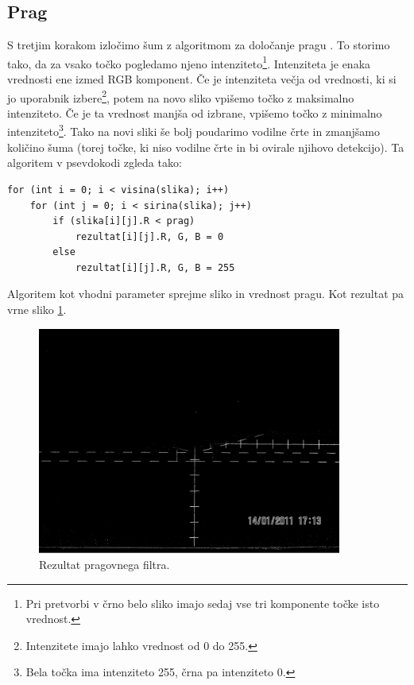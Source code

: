 \documentclass[oneside, a4paper, 12pt]{book}
\begin{document}
\subsection{Prag}
S tretjim korakom izločimo šum z algoritmom za določanje pragu \cite{treshold-wiki}. To storimo tako, da za vsako točko pogledamo njeno intenziteto\footnote{Pri pretvorbi v črno belo sliko imajo sedaj vse tri komponente točke isto vrednost.}. Intenziteta je enaka vrednosti ene izmed RGB komponent. Če je intenziteta večja od vrednosti, ki si jo uporabnik izbere\footnote{Intenzitete imajo lahko vrednost od 0 do 255.}, potem na novo sliko vpišemo točko z maksimalno intenziteto. Če je ta vrednost manjša od izbrane, vpišemo točko z minimalno intenziteto\footnote{Bela točka ima intenziteto 255, črna pa intenziteto 0.}. Tako na novi sliki še bolj poudarimo vodilne črte in zmanjšamo količino šuma (torej točke, ki niso vodilne črte in bi ovirale njihovo detekcijo). Ta algoritem v psevdokodi zgleda tako:
\begin{samepage}
\begin{verbatim}
for (int i = 0; i < visina(slika); i++)
    for (int j = 0; i < sirina(slika); j++)
        if (slika[i][j].R < prag)
            rezultat[i][j].R, G, B = 0
        else
            rezultat[i][j].R, G, B = 255
\end{verbatim}
\end{samepage}
Algoritem kot vhodni parameter sprejme sliko in vrednost pragu. Kot rezultat pa vrne sliko \ref{pic:treshold}.

\begin{figure}
\begin{center}
\includegraphics[width=10cm]{slike/treshold.jpg}
\end{center}
\caption{Rezultat pragovnega filtra.}
\label{pic:treshold}
\end{figure}
\end{document}

